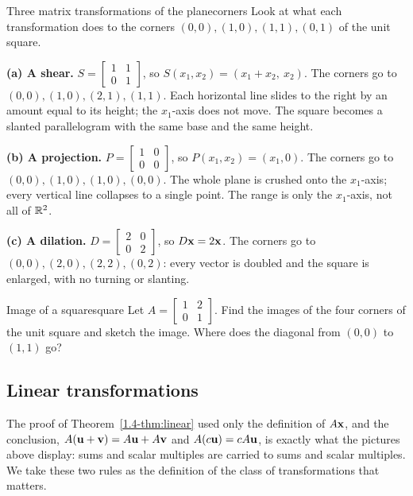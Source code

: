 \documentclass[11pt]{article}
\begin{document}
\begin{exmp}{Three matrix transformations of the plane}{corners}
Look at what each transformation does to the corners $(0,0),(1,0),(1,1),(0,1)$ of the unit square.

\textbf{(a) A shear.} $S=\begin{bmatrix}1&1\\0&1\end{bmatrix}$, so $S(x_1,x_2)=(x_1+x_2,\ x_2)$. The corners go to $(0,0),(1,0),(2,1),(1,1)$. Each horizontal line slides to the right by an amount equal to its height; the $x_1$-axis does not move. The square becomes a slanted parallelogram with the same base and the same height.

\textbf{(b) A projection.} $P=\begin{bmatrix}1&0\\0&0\end{bmatrix}$, so $P(x_1,x_2)=(x_1,0)$. The corners go to $(0,0),(1,0),(1,0),(0,0)$. The whole plane is crushed onto the $x_1$-axis; every vertical line collapses to a single point. The range is only the $x_1$-axis, not all of $\mathbb{R}^2$.

\textbf{(c) A dilation.} $D=\begin{bmatrix}2&0\\0&2\end{bmatrix}$, so $D\mathbf{x}=2\mathbf{x}$. The corners go to $(0,0),(2,0),(2,2),(0,2)$: every vector is doubled and the square is enlarged, with no turning or slanting.
\end{exmp}

\begin{kc}{Image of a square}{square}
Let $A=\begin{bmatrix}1&2\\0&1\end{bmatrix}$. Find the images of the four corners of the unit square and sketch the image. Where does the diagonal from $(0,0)$ to $(1,1)$ go?
\end{kc}

\subsection*{Linear transformations}

The proof of Theorem~\ref{1.4-thm:linear} used only the definition of $A\mathbf{x}$, and the conclusion, $A(\mathbf{u}+\mathbf{v})=A\mathbf{u}+A\mathbf{v}$ and $A(c\mathbf{u})=cA\mathbf{u}$, is exactly what the pictures above display: sums and scalar multiples are carried to sums and scalar multiples. We take these two rules as the definition of the class of transformations that matters.
\end{document}
